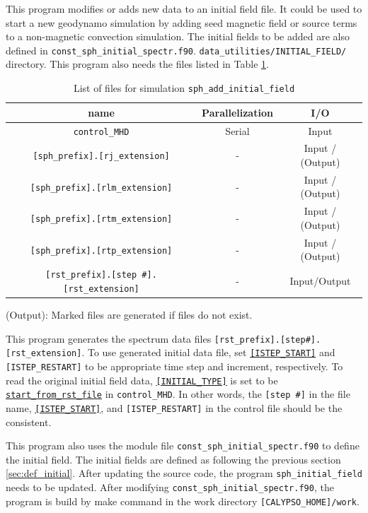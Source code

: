  This program modifies or adds new data to an initial field file. It could be used to start a new geodynamo simulation by adding seed magnetic field or source terms to a non-magnetic convection simulation. The initial fields to be added are also defined in \verb|const_sph_initial_spectr.f90|. \verb|data_utilities/INITIAL_FIELD/| directory. This program also needs the files listed in Table \ref{table:add_inital_fld}.
%
\begin{table}[htp]
\caption{List of files for simulation {\tt sph\_add\_initial\_field} }
\begin{center} 
\begin{tabular}{|c|c|c|}
\hline
 name & Parallelization & I/O \\ \hline \hline
\verb|control_MHD| & Serial & Input \\ \hline
\verb|[sph_prefix].[rj_extension]|  & - & Input / (Output) \\
\verb|[sph_prefix].[rlm_extension]| & - & Input / (Output)  \\
\verb|[sph_prefix].[rtm_extension]| & - & Input / (Output)  \\
\verb|[sph_prefix].[rtp_extension]| & - & Input / (Output)  \\ \hline
\verb|[rst_prefix].[step #].[rst_extension]| & - & Input/Output  \\ \hline
\end{tabular}
\end{center}
(Output): Marked files are generated if files do not exist.
\label{table:add_inital_fld}
\end{table}
%
This program generates the spectrum data files \verb|[rst_prefix].[step#].[rst_extension]|. To use generated initial data file, set 
 \hyperref[href_t:i_step_init_ctl]{{\tt [ISTEP\_START]}} and \verb|[ISTEP_RESTART]| to be appropriate time step and increment, respectively.
To read the original initial field data, \hyperref[href_t:restart_file_ctl]{{\tt [INITIAL\_TYPE]}} is set to be \hyperref[href_t:restart_file_ctl]{{\tt start\_from\_rst\_file}} in \verb|control_MHD|. In other words, the \verb|[step #]| in the file name, \hyperref[href_t:i_step_init_ctl]{{\tt [ISTEP\_START]}}, and \verb|[ISTEP_RESTART]| in the control file should be the consistent.

This program also uses the module file \verb|const_sph_initial_spectr.f90| to define the initial field. The initial fields are defined as following the previous section \ref{sec:def_initial}. After updating the source code, the program \verb|sph_initial_field| needs to be updated. After modifying  \verb|const_sph_initial_spectr.f90|, the program is build by make command in  the work directory \verb|[CALYPSO_HOME]/work|.

